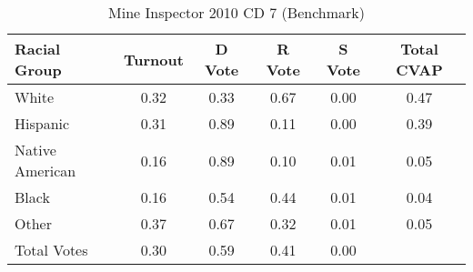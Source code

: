 \begin{table}[htb]
\begin{center}
\caption{Mine Inspector 2010 CD 7 (Benchmark)}
\label{smine_cvap_cd_7_benchmark}
\begin{tabular}{lccccc}
  \hline
Racial Group & Turnout & D Vote & R Vote & S Vote & Total CVAP \\ 
  \hline
White & 0.32 & 0.33 & 0.67 & 0.00 & 0.47 \\ 
  Hispanic & 0.31 & 0.89 & 0.11 & 0.00 & 0.39 \\ 
  Native American & 0.16 & 0.89 & 0.10 & 0.01 & 0.05 \\ 
  Black & 0.16 & 0.54 & 0.44 & 0.01 & 0.04 \\ 
  Other & 0.37 & 0.67 & 0.32 & 0.01 & 0.05 \\ 
  Total Votes & 0.30 & 0.59 & 0.41 & 0.00 &  \\ 
   \hline
\end{tabular}
\end{center}
\end{table}
